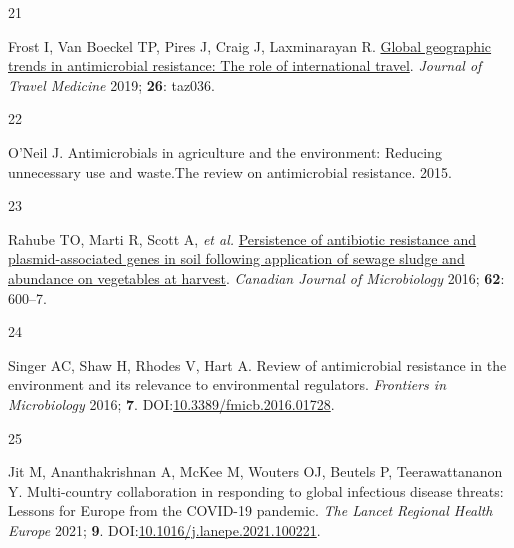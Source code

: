 \documentclass[
]{book}
\newlength{\cslhangindent}
\newlength{\csllabelwidth}
\newlength{\cslentryspacingunit} %
\newenvironment{CSLReferences}[2] %
 {%
  \setlength{\parindent}{0pt}
  \ifodd #1
  \let\oldpar\par
  \def\par{\hangindent=\cslhangindent\oldpar}
  \fi
  \setlength{\parskip}{#2\cslentryspacingunit}
 }%
 {}
\newcommand{\CSLLeftMargin}[1]{\parbox[t]{\csllabelwidth}{#1}}
\newcommand{\CSLRightInline}[1]{\parbox[t]{\linewidth - \csllabelwidth}{#1}\break}
\begin{document}
\begin{CSLReferences}{0}{0}
\leavevmode{}%
\CSLLeftMargin{21 }
\CSLRightInline{Frost I, Van Boeckel TP, Pires J, Craig J, Laxminarayan R. \href{https://doi.org/10.1093/jtm/taz036}{Global geographic trends in antimicrobial resistance: The role of international travel}. \emph{Journal of Travel Medicine} 2019; \textbf{26}: taz036.}

\leavevmode{}%
\CSLLeftMargin{22 }
\CSLRightInline{O'Neil J. Antimicrobials in agriculture and the environment: Reducing unnecessary use and waste.{The} review on antimicrobial resistance. 2015.}

\leavevmode{}%
\CSLLeftMargin{23 }
\CSLRightInline{Rahube TO, Marti R, Scott A, \emph{et al.} \href{https://doi.org/10.1139/cjm-2016-0034}{Persistence of antibiotic resistance and plasmid-associated genes in soil following application of sewage sludge and abundance on vegetables at harvest}. \emph{Canadian Journal of Microbiology} 2016; \textbf{62}: 600--7.}

\leavevmode{}%
\CSLLeftMargin{24 }
\CSLRightInline{Singer AC, Shaw H, Rhodes V, Hart A. Review of antimicrobial resistance in the environment and its relevance to environmental regulators. \emph{Frontiers in Microbiology} 2016; \textbf{7}. DOI:\href{https://doi.org/10.3389/fmicb.2016.01728}{10.3389/fmicb.2016.01728}.}

\leavevmode{}%
\CSLLeftMargin{25 }
\CSLRightInline{Jit M, Ananthakrishnan A, McKee M, Wouters OJ, Beutels P, Teerawattananon Y. Multi-country collaboration in responding to global infectious disease threats: Lessons for {Europe} from the {COVID-19} pandemic. \emph{The Lancet Regional Health \textendash{} Europe} 2021; \textbf{9}. DOI:\href{https://doi.org/10.1016/j.lanepe.2021.100221}{10.1016/j.lanepe.2021.100221}.}

\end{CSLReferences}
\end{document}
